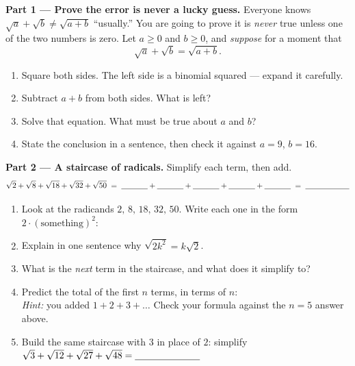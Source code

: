 \documentclass[10pt]{article}
\begin{document}
\begin{tcolorbox}[colback=white, colframe=black!40, title=\textbf{Tier E --- Extension},
    fonttitle=\bfseries, arc=1.5mm, left=3mm, right=3mm, top=2mm, bottom=2mm, breakable]
\textbf{Part 1 --- Prove the error is never a lucky guess.} Everyone knows
$\sqrt{a}+\sqrt{b}\ne\sqrt{a+b}$ ``usually.'' You are going to prove it is \emph{never} true unless
one of the two numbers is zero. Let $a\ge 0$ and $b\ge 0$, and \emph{suppose} for a moment that
\[
  \sqrt{a}+\sqrt{b}=\sqrt{a+b}.
\]
\begin{enumerate}[label=(\alph*), leftmargin=1.9em, itemsep=5pt]
  \item Square both sides. The left side is a binomial squared --- expand it carefully.
        \writeline
  \item Subtract $a+b$ from both sides. What is left? \blank{3.4cm}
  \item Solve that equation. What must be true about $a$ and $b$? \blank{3.6cm}
  \item State the conclusion in a sentence, then check it against $a=9$, $b=16$. 
\end{enumerate}

\vspace{5pt}
\textbf{Part 2 --- A staircase of radicals.} Simplify each term, then add.
\[
  \sqrt{2}+\sqrt{8}+\sqrt{18}+\sqrt{32}+\sqrt{50} \;=\;
  \blank{1.2cm}+\blank{1.2cm}+\blank{1.2cm}+\blank{1.2cm}+\blank{1.2cm}
  \;=\; \blank{2.0cm}
\]
\begin{enumerate}[label=(\alph*), leftmargin=1.9em, itemsep=5pt]
  \item Look at the radicands $2,\,8,\,18,\,32,\,50$. Write each one in the form
        $2\cdot(\text{something})^{2}$: \blank{6.0cm}
  \item Explain in one sentence why $\sqrt{2k^{2}}=k\sqrt{2}$. \writeline
  \item What is the \emph{next} term in the staircase, and what does it simplify to?
        \blank{3.6cm}
  \item Predict the total of the first $n$ terms, in terms of $n$: \blank{3.0cm} \\
        \emph{Hint:} you added $1+2+3+\dots$ Check your formula against the $n=5$ answer above.
        \writeline
  \item Build the same staircase with $3$ in place of $2$: simplify
        $\sqrt{3}+\sqrt{12}+\sqrt{27}+\sqrt{48}=\blank{2.4cm}$
\end{enumerate}


\end{tcolorbox}
\end{document}
